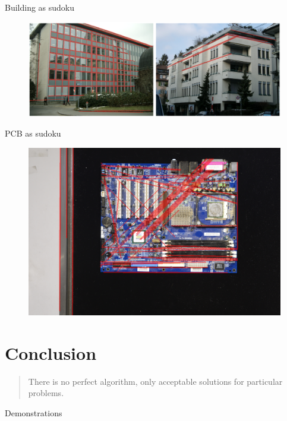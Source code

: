 \documentclass[12pt]{beamer}
\begin{document}
\begin{frame}{Building as sudoku}
    \begin{figure}
        \includegraphics[width=\textwidth]{resources/png/building_as_sudoku.png}
    \end{figure}
\end{frame}

\begin{frame}{PCB as sudoku}
    \begin{figure}
        \includegraphics[width=\textwidth]{resources/png/pcb_as_sudoku.png}
    \end{figure}
\end{frame}

\section{Conclusion}

\begin{frame}
    \vspace{2em}
    \begin{quote}
        There is no perfect algorithm, only acceptable solutions for particular problems.
    \end{quote}
\end{frame}

\begin{frame}[standout]
    Demonstrations
\end{frame}
\end{document}
